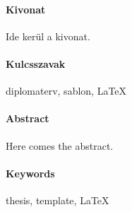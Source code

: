 \begin{otherlanguage}{magyar}

  \paragraph*{Kivonat}
  \thispagestyle{plain}

  Ide kerül a kivonat.
  
  \paragraph{Kulcsszavak} diplomaterv, sablon, \LaTeX
\end{otherlanguage}

\cleardoublepage

\paragraph*{Abstract}
{}
\thispagestyle{plain}

Here comes the abstract.

\paragraph{Keywords} thesis, template, \LaTeX

